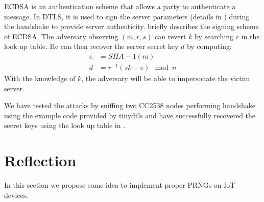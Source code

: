 \begin{itemize}
	ECDSA is an authentication scheme that allows a party to authenticate a message. In DTLS, it is used to sign the server parameters (details in \cite{rfc3279}) during the handshake to provide server authenticity.  briefly describes the signing scheme of ECDSA. The adversary observing $(m,r,s)$ can revert $k$ by searching $r$ in the look up table. He can then recover the server secret key $d$ by computing:
	\begin{equation}
		\begin{aligned}
		e &= SHA-1(m) \\
		d &= r^{-1}(sk - e) \mod n
		\end{aligned}
	\end{equation}
	With the knowledge of $k$, the adversary will be able to impersonate the victim server.
\end{itemize}

We have tested the attacks by sniffing two CC2538 nodes performing handshake using the example code provided by tinydtls and have successfully recovered the secret keys using the look up table in \cite{prngtest}.

\section{Reflection}
In this section we propose some idea to implement proper PRNGs on IoT devices.